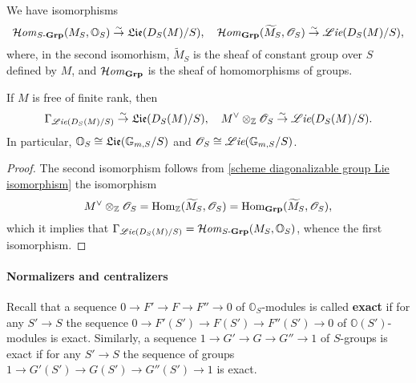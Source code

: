 \begin{proposition}\label{scheme diagonalizable group Lie isomorphism}
We have isomorphisms
\[\operatorname{\mathcal{H}\hspace*{-0.4pt}\textit{om}\hspace{0.5pt}}_{S\textup{-}\mathbf{Grp}}(M_S,\mathbb{O}_S)\stackrel{\sim}{\to}\mathfrak{Lie}(D_S(M)/S),\quad \operatorname{\mathcal{H}\hspace*{-0.4pt}\textit{om}\hspace{0.5pt}}_{\mathbf{Grp}}(\widetilde{M}_S,\mathscr{O}_S)\stackrel{\sim}{\to} \operatorname{\mathscr{L}\hspace*{-0.5pt}\textit{ie}}(D_S(M)/S),\]
where, in the second isomorhism, $\widetilde{M}_S$ is the sheaf of constant group over $S$ defined by $M$, and $\operatorname{\mathcal{H}\hspace*{-0.4pt}\textit{om}\hspace{0.5pt}}_{\mathbf{Grp}}$ is the sheaf of homomorphisms of groups.
\end{proposition}

\begin{corollary}\label{scheme diagonalizable group of free group Lie isomorphism}
If $M$ is free of finite rank, then
\[\Gamma_{\operatorname{\mathscr{L}\hspace*{-0.5pt}\textit{ie}}(D_S(M)/S)}\stackrel{\sim}{\to} \mathfrak{Lie}(D_S(M)/S),\quad M^{\vee}\otimes_{\mathbb{Z}}\mathscr{O}_S\stackrel{\sim}{\to} \operatorname{\mathscr{L}\hspace*{-0.5pt}\textit{ie}}(D_S(M)/S).\]
In particular, $\mathbb{O}_S\cong\mathfrak{Lie}(\mathbb{G}_{m,S}/S)$ and $\mathscr{O}_S\cong\operatorname{\mathscr{L}\hspace*{-0.5pt}\textit{ie}}(\mathbb{G}_{m,S}/S)$.
\end{corollary}
\begin{proof}
The second isomorphism follows from \cref{scheme diagonalizable group Lie isomorphism} the isomorphism
\[M^\vee\otimes_{\mathbb{Z}}\mathscr{O}_S=\mathrm{Hom}_{\mathbb{Z}}(\widetilde{M}_S,\mathscr{O}_S)=\mathrm{Hom}_{\mathbf{Grp}}(\widetilde{M}_S,\mathscr{O}_S),\]
which it implies that $\Gamma_{\operatorname{\mathscr{L}\hspace*{-0.5pt}\textit{ie}}(D_S(M)/S)}=\operatorname{\mathcal{H}\hspace*{-0.4pt}\textit{om}\hspace{0.5pt}}_{S\textup{-}\mathbf{Grp}}(M_S,\mathbb{O}_S)$, whence the first isomorphism.
\end{proof}

\paragraph{Normalizers and centralizers} Recall that a sequence $0\to F'\to F\to F''\to 0$ of $\mathbb{O}_S$-modules is called \textbf{exact} if for any $S'\to S$ the sequence $0\to F'(S')\to F(S')\to F''(S')\to 0$ of $\mathbb{O}(S')$-modules is exact. Similarly, a sequence $1\to G'\to G\to G''\to 1$ of $S$-groups is exact if for any $S'\to S$ the sequence of groups $1\to G'(S')\to G(S')\to G''(S')\to 1$ is exact.


